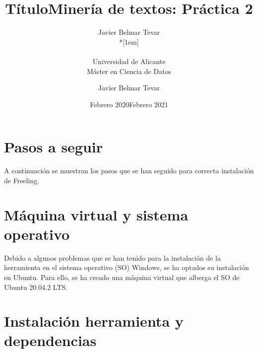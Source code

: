 \documentclass[11pt,twoside]{article}
\title{Título}
\author{Javier Belmar Tevar\\*[1em]
\begin{minipage}{0.75\textwidth}
\footnotesize \itshape
\begin{center}
Universidad de Alicante \\
Máster en Ciencia de Datos
\end{center}
\end{minipage}
}
\date{Febrero 2020}
\title{Minería de textos: Práctica 2}
\author{Javier Belmar Tevar }
\date{Febrero 2021}
\numberwithin{equation}{section}
\theoremstyle{plain}
\theoremstyle{definition}
\theoremstyle{remark}
\begin{document}
\maketitle

\newpage

\thispagestyle{empty}

\newpage
\thispagestyle{empty}
\pagestyle{empty}
\tableofcontents
\cleardoublepage
\pagestyle{fancy}
\newpage



\setcounter{page}{0}
\setcounter{page}{1}



\section{Pasos a seguir}

A continuación se muestran los pasos que se han seguido para correcta instalación de Freeling.

\section{Máquina virtual y sistema operativo}

Debido a algunos problemas que se han tenido para la instalación de la herramienta en el sistema operativo (SO) Windows, se ha optados su instalación en Ubuntu. Para ello, se ha creado una máquina virtual que alberga el SO de Ubuntu 20.04.2 LTS.

\section{Instalación herramienta y dependencias}
\end{document}
